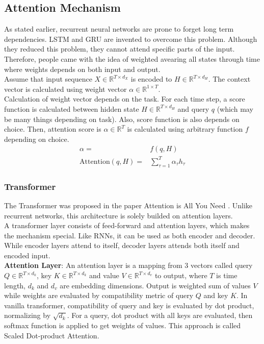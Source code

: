 \subsection{Attention Mechanism}
As stated earlier, recurrent neural networks are prone to forget long term dependencies. LSTM and GRU are invented to overcome this problem. Although they reduced this problem, they cannot attend specific parts of the input. Therefore, people came with the idea of weighted avearing all states through time where weights depends on both input and output. \\
Assume that input sequence $X \in \mathbb{R}^{T \times d_X}$ is encoded to $H \in \mathbb{R}^{T \times d_H}$. The context vector is calculated using weight vector $\alpha \in \mathbb{R}^{1 \times T}$. \\
Calculation of weight vector depends on the task. For each time step, a score function is calculated between hidden state $H \in \mathbb{R}^{T \times d_H}$ and query $q$ (which may be many things depending on task). Also, score function is also depends on choice. Then, attention score is $\alpha \in \mathbb{R}^{T}$ is calculated using arbitrary function $f$ depending on choice. \\
\begin{equation}
\begin{split}
\alpha = & f(q, H) \\
\mathrm{Attention}(q, H) = & \sum_{\tau=1}^{T} \alpha_{\tau} h_{\tau}
\end{split}
\end{equation}


\subsubsection{Transformer}
The Transformer was proposed in the paper Attention is All You Need \cite{vaswani_attention_2017} . Unlike recurrent networks, this architecture is solely builded on attention layers. \\
A transformer layer consists of feed-forward and attention layers, which makes the mechanism special. Like RNNs, it can be used as both encoder and decoder. While encoder layers attend to itself, decoder layers attends both itself and encoded input. \\
\textbf{Attention Layer}: An attention layer is a mapping from 3 vectors called query $Q \in \mathbb{R}^{T \times d_k}$, key $K \in \mathbb{R}^{T \times d_k}$ and value $V \in \mathbb{R}^{T \times d_v}$ to output, where $T$ is time length, $d_k$ and $d_v$ are embedding dimensions. Output is weighted sum of values $V$ while weights are evaluated by compatibility metric of query $Q$ and key $K$. In vanilla transformer, compatibility of query and key is evaluated by dot product, normalizing by $\sqrt{d_k}$. For a query, dot product with all keys are evaluated, then softmax function is applied to get weights of values. This approach is called Scaled Dot-product Attention.

